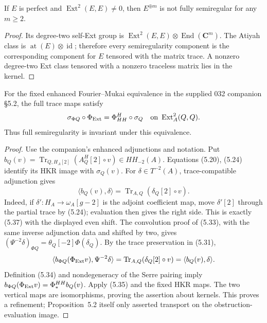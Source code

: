 \begin{proposition}
\label{prop:semireg-multiplicity}
If $E$ is perfect and $\operatorname{Ext}^2(E,E)\ne0$, then
$E^{\oplus m}$ is not fully semiregular for any $m\geq2$.
\end{proposition}
\begin{proof}
Its degree-two self-Ext group is
$\operatorname{Ext}^2(E,E)\otimes\operatorname{End}(\mathbf C^m)$.
The Atiyah class is $\operatorname{at}(E)\otimes\operatorname{id}$;
therefore every semiregularity component is the corresponding
component for $E$ tensored with the matrix trace.
A nonzero degree-two Ext class tensored with a nonzero traceless
matrix lies in the kernel.
\end{proof}

\begin{proposition}
\label{prop:semireg-full-fm}
For the fixed enhanced Fourier--Mukai equivalence in the supplied
032 companion \S5.2, the full trace maps satisfy
\[
 \sigma_{\Phi Q}\circ\Phi_{\rm Ext}
   =\Phi^H_{HH}\circ\sigma_Q
 \quad\hbox{on }\operatorname{Ext}^2_A(Q,Q).
\]
Thus full semiregularity is invariant under this equivalence.
\end{proposition}
\begin{proof}
Use the companion's enhanced adjunctions and notation.
Put
$b_Q(v)=\operatorname{Tr}_{Q,H_A[2]}(A_Q^H[2]\circ v)
\in HH_{-2}(A)$.
Equations (5.20), (5.24) identify its HKR image with $\sigma_Q(v)$.
For $\delta\in T^{-2}(A)$, trace-compatible adjunction gives
\[
 \langle b_Q(v),\delta\rangle
   =\operatorname{Tr}_{A,Q}(\delta_Q[2]\circ v).
\]
Indeed, if $\delta':H_A\to\omega_A[g-2]$ is the adjoint coefficient
map, move $\delta'[2]$ through the partial trace by (5.24);
evaluation then gives the right side. This is exactly (5.37)
with the displayed even shift.
The convolution proof of (5.33), with the same inverse adjunction
data and shifted by two, gives
$(\Psi^{-2}\delta)_{\Phi Q}=\theta_Q[-2]\Phi(\delta_Q)$.
By the trace preservation in (5.31),
\[
 \langle b_{\Phi Q}(\Phi_{\rm Ext}v),\Psi^{-2}\delta\rangle
  =\operatorname{Tr}_{A,Q}(\delta_Q[2]\circ v)
  =\langle b_Q(v),\delta\rangle.
\]
Definition (5.34) and nondegeneracy of the Serre pairing imply
$b_{\Phi Q}(\Phi_{\rm Ext}v)=\Phi_*^{HH}b_Q(v)$.
Apply (5.35) and the fixed HKR maps. The two vertical maps
are isomorphisms, proving the assertion about kernels.
This proves a refinement; Proposition~5.2 itself only asserted
transport on the obstruction-evaluation image.
\end{proof}

